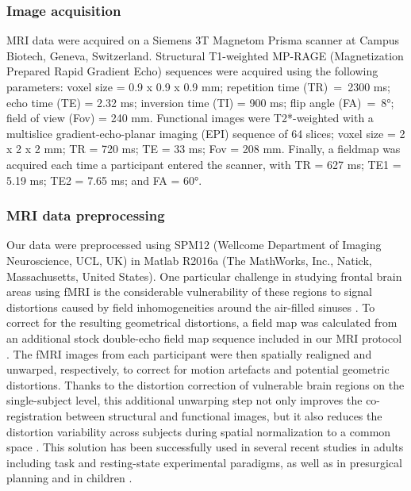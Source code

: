 \subsubsection{Image acquisition} \label{section:OFC_imgAcquisition}
MRI data were acquired on a Siemens 3T Magnetom Prisma scanner at Campus Biotech, Geneva, Switzerland. Structural T1-weighted MP-RAGE (Magnetization Prepared Rapid Gradient Echo) sequences were acquired using the following parameters: voxel size = 0.9 x 0.9 x 0.9 mm; repetition time (TR)~=~2300 ms; echo time (TE) = 2.32 ms; inversion time (TI) = 900 ms; flip angle (FA)~=~8°; field of view (Fov) = 240 mm. Functional images were T2*-weighted with a multislice gradient-echo-planar imaging (EPI) sequence of 64 slices; voxel size = 2 x 2 x 2 mm; TR = 720 ms; TE = 33 ms; Fov = 208 mm. Finally, a fieldmap was acquired each time a participant entered the scanner, with TR = 627 ms; TE1 = 5.19 ms; TE2 = 7.65 ms; and FA = 60°.


\subsubsection{MRI data preprocessing}  \label{section:OFC_preprocessing}
Our data were preprocessed using SPM12 (Wellcome Department of Imaging Neuroscience, UCL, UK) in Matlab R2016a (The MathWorks, Inc., Natick, Massachusetts, United States). One particular challenge in studying frontal brain areas using fMRI is the considerable vulnerability of these regions to signal distortions caused by field inhomogeneities around the air-filled sinuses \citep{Gorno-Tempini2002}. To correct for the resulting geometrical distortions, a field map was calculated from an additional stock double-echo field map sequence included in our MRI protocol \citep{Hutton2002}. The fMRI images from each participant were then spatially realigned and unwarped, respectively, to correct for motion artefacts and potential geometric distortions. Thanks to the distortion correction of vulnerable brain regions on the single-subject level, this additional unwarping step not only improves the co-registration between structural and functional images, but it also reduces the distortion variability across subjects during spatial normalization to a common space \citep{Hutton2002}.  This solution has been successfully used in several recent studies in adults including task \citep{Daw2011} and resting-state \citep{Togo2017} experimental paradigms, as well as in presurgical planning \citep{LimaCardoso2018} and in children \citep{Wozniak2011}.

